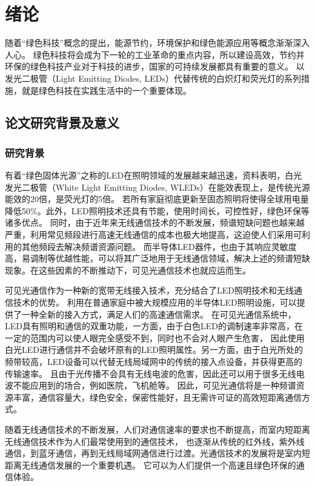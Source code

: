 
\chapter{绪论}\label{chap:introduction}
随着“绿色科技”概念的提出，能源节约，环境保护和绿色能源应用等概念渐渐深入人心。
绿色科技将会成为下一轮的工业革命的重点内容，所以建设高效，节约并环保的绿色科技产业对于科技的进步，国家的可持续发展都具有重要的意义。
以发光二极管（Light Emitting Diodes, LEDs）代替传统的白炽灯和荧光灯的系列措施，就是绿色科技在实践生活中的一个重要体现。

\section{论文研究背景及意义}\label{sec:background}
\subsection{研究背景}
有着“绿色固体光源”之称的LED在照明领域的发展越来越迅速，资料表明，白光发光二极管（White Light Emitting Diodes, WLEDs）在能效表现上，是传统光源能效的20倍，是荧光灯的5倍。
若所有家庭彻底更新至固态照明将使得全球用电量降低50\%\cite{DingJuPeng2005}。此外，LED照明技术还具有节能，使用时间长，可控性好，绿色环保等诸多优点。
同时，由于近年来无线通信技术的不断发展，频谱短缺问题也越来越严重，利用常见频段进行高速无线通信的成本也极大地提高，这迫使人们采用可利用的其他频段去解决频谱资源问题。
而半导体LED器件，也由于其响应灵敏度高，易调制等优越性能，可以将其广泛地用于无线通信领域，解决上述的频谱短缺现象\cite{KomineT2004}。在这些因素的不断推动下，可见光通信技术也就应运而生。

可见光通信作为一种新的宽带无线接入技术，充分结合了LED照明技术和无线通信技术的优势。
利用在普通家庭中被大规模应用的半导体LED照明设施，可以提供了一种全新的接入方式，满足人们的高速通信需求。
在可见光通信系统中，LED具有照明和通信的双重功能\cite{SongZhengXun2008}，一方面，由于白色LED的调制速率非常高，在一定的范围内可以使人眼完全感受不到，同时也不会对人眼产生危害，
因此使用白光LED进行通信并不会破坏原有的LED照明属性。另一方面，由于白光所处的频带较高，LED设备可以代替无线局域网中的传统的接入点设备，并获得更高的传输速率。
且由于光传播不会具有无线电波的危害，因此还可以用于很多无线电波不能应用到的场合，例如医院，飞机舱等\cite{ChenRan2013}。
因此，可见光通信将是一种频谱资源丰富，通信容量大，绿色安全，保密性能好，且无需许可证的高效短距离通信方式。

随着无线通信技术的不断发展，人们对通信速率的要求也不断提高，而室内短距离无线通信技术作为人们最常使用到的通信技术，
也逐渐从传统的红外线，紫外线通信，到蓝牙通信，再到无线局域网通信进行过渡。光通信技术的发展将是室内短距离无线通信发展的一个重要机遇。
它可以为人们提供一个高速且绿色环保的通信体验。

